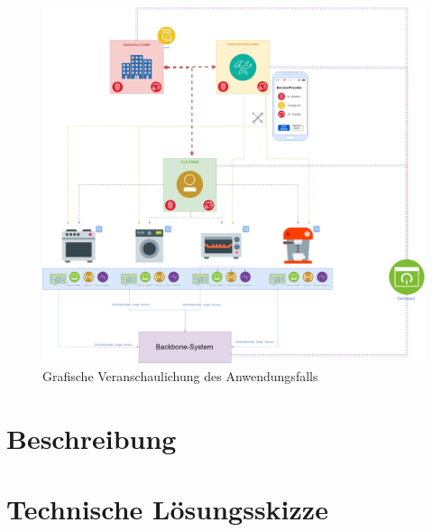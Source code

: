 \begin{figure}[htbp]
 \centering
 \includegraphics[width=1.0\textwidth]{gfx/IOT-Anwendungsfall.png}
 \caption{Grafische Veranschaulichung des Anwendungsfalls}
 \label{fig:chapter04:usecase}
\end{figure}


%
%
\section{Beschreibung}
\label{sec:iot_usecase:description}
\lipsum[1-1]

%
%
\section{Technische Lösungsskizze}
\label{sec:iot_usecase:solution}
\lipsum[1-1]
